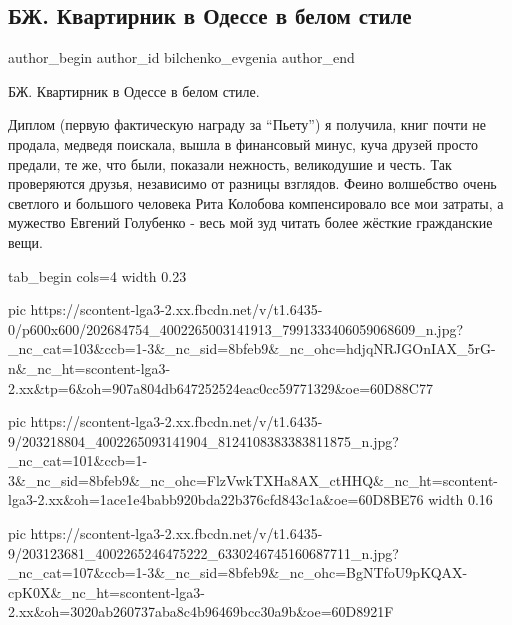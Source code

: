  
 
 
 
 
 
\subsection{БЖ. Квартирник в Одессе в белом стиле}
\label{sec:23_06_2021.fb.bilchenko_evgenia.4.kvartirnik_odessa}
\ifcmt
 author_begin
   author_id bilchenko_evgenia
 author_end
\fi

БЖ. Квартирник в Одессе в белом стиле.

Диплом (первую фактическую награду за \enquote{Пьету}) я получила, книг почти
не продала, медведя поискала, вышла в финансовый минус, куча друзей просто
предали, те же, что были, показали нежность, великодушие и честь. Так
проверяются друзья, независимо от разницы взглядов.  Феино волшебство очень
светлого и большого человека Рита Колобова компенсировало все мои затраты, а
мужество Евгений Голубенко  - весь мой зуд читать более жёсткие гражданские
вещи. 


\ifcmt
  tab_begin cols=4
     width 0.23

     pic https://scontent-lga3-2.xx.fbcdn.net/v/t1.6435-0/p600x600/202684754_4002265003141913_7991333406059068609_n.jpg?_nc_cat=103&ccb=1-3&_nc_sid=8bfeb9&_nc_ohc=hdjqNRJGOnIAX_5rG-n&_nc_ht=scontent-lga3-2.xx&tp=6&oh=907a804db647252524eac0cc59771329&oe=60D88C77

     pic https://scontent-lga3-2.xx.fbcdn.net/v/t1.6435-9/203218804_4002265093141904_8124108383383811875_n.jpg?_nc_cat=101&ccb=1-3&_nc_sid=8bfeb9&_nc_ohc=FlzVwkTXHa8AX_ctHHQ&_nc_ht=scontent-lga3-2.xx&oh=1ace1e4babb920bda22b376cfd843c1a&oe=60D8BE76
     width 0.16

     pic https://scontent-lga3-2.xx.fbcdn.net/v/t1.6435-9/203123681_4002265246475222_6330246745160687711_n.jpg?_nc_cat=107&ccb=1-3&_nc_sid=8bfeb9&_nc_ohc=BgNTfoU9pKQAX-cpK0X&_nc_ht=scontent-lga3-2.xx&oh=3020ab260737aba8c4b96469bcc30a9b&oe=60D8921F

